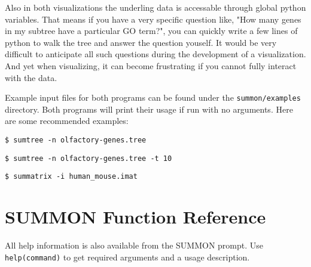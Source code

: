 \documentclass[12pt]{article}
\newcommand{\code}[1]{{\tt #1}}
\newcommand{\codeblock}[1]{\vspace{.1in} {\tt #1} \vspace{.1in}}
\begin{document}
Also in both visualizations the underling data is accessable through global python
variables.  That means if you have a very specific question like, "How many
genes in my subtree have a particular GO term?", you can quickly write a few
lines of python to walk the tree and answer the question youself.  It would be
very difficult to anticipate all such questions during the development of a
visualization.  And yet when visualizing, it can become frustrating if you cannot
fully interact with the  data.

Example input files for both programs can be found under the 
\code{summon/examples} directory.  Both programs will print their usage if run
with no arguments.  Here are some recommended examples:

\codeblock{\$ sumtree -n olfactory-genes.tree}

\codeblock{\$ sumtree -n olfactory-genes.tree -t 10}

\codeblock{\$ summatrix -i human\_mouse.imat}


\section{SUMMON Function Reference}

All help information is also available from the SUMMON prompt.  Use 
\code{help(command)} to get required arguments and a usage description.


\end{document}
